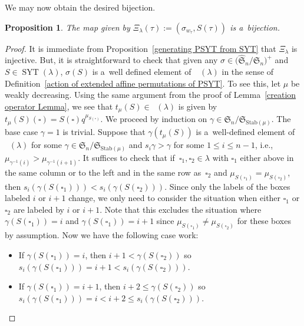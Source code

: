 \documentclass[10pt,a4paper]{amsart}
\numberwithin{equation}{section}
\newtheorem{Proposition}[Theorem]{Proposition}
\theoremstyle{definition}
\DeclareMathOperator{\SYT}{\mathrm{SYT}}
\DeclareMathOperator{\PSYT}{\mathrm{PSYT}_{\geq 0}}
\begin{document}
We may now obtain the desired bijection.

\begin{Proposition}\label{bijection between PSYT and pairs on min coset reps and SYT}
 The map \smash{$\Xi_{\lambda}\colon \PSYT(\lambda) \rightarrow \bigl(\widehat{\mathfrak{S}}_n/\mathfrak{S}_n \bigr)^{+} \times \SYT(\lambda)$} given by
 $\Xi_{\lambda}(\tau) := (\sigma_{w_{\tau}},\allowbreak S(\tau))$ is a~bijection.
\end{Proposition}
\begin{proof}
 It is immediate from Proposition~\ref{generating PSYT from SYT} that $\Xi_{\lambda}$ is injective. But, it is straightforward to check that given any $\sigma \in \bigl(\widehat{\mathfrak{S}}_n/\mathfrak{S}_n \bigr)^{+}$ and $S \in \SYT(\lambda)$, $\sigma(S)$ is a~well defined element of~$\PSYT(\lambda)$ in the sense of Definition~\ref{action of extended affine permutations of PSYT}. To see this, let $\mu$ be weakly decreasing. Using the same argument from the proof of Lemma~\ref{creation operator Lemma}, we see that $t_{\mu}(S) \in \PSYT(\lambda)$ is given by~${t_{\mu}(S)(\square) = S(\square) q^{\mu_{S(\square)}}}$. We proceed by induction on $\gamma \in \mathfrak{S}_n/\mathfrak{S}_{\text{Stab}(\mu)}$. The base case $\gamma = 1$ is trivial. Suppose that $\gamma(t_{\mu}(S))$ is a~well-defined element of $\PSYT(\lambda)$ for some $\gamma \in \mathfrak{S}_n/\mathfrak{S}_{\text{Stab}(\mu)}$ and $s_i\gamma > \gamma$ for some $1\leq i \leq n-1$, i.e.,
 $\mu_{\gamma^{-1}(i)} > \mu_{\gamma^{-1}(i+1)}$. It suffices to check that if~${\square_1,\square_2 \in \lambda}$ with $\square_1$ either above in the same column or to the left and in the same row as~$\square_2$ and $\mu_{S(\square_1)} = \mu_{S(\square_2)}$, then $s_i(\gamma(S(\square_1))) < s_i(\gamma(S(\square_2)))$. Since only the labels of the boxes labeled $i$ or $i+1$ change, we only need to consider the situation when either $\square_1$ or $\square_2$ are labeled by $i$ or $i+1$. Note that this excludes the situation where $\gamma(S(\square_1)) = i$ and $\gamma(S(\square_1)) = i+1$ since $\mu_{S(\square_1)} \neq \mu_{S(\square_2)}$ for these boxes by assumption. Now we have the following case work:
 \begin{itemize}
\itemsep=0pt
 \item If $ \gamma(S(\square_1)) = i$, then $ i+1 < \gamma(S(\square_2))$ so $s_i(\gamma(S(\square_1))) = i+1 < s_i(\gamma(S(\square_2)))$.
 \item If $\gamma(S(\square_1)) = i+1$, then $i+2 \leq \gamma(S(\square_2))$ so $s_i(\gamma(S(\square_1))) = i < i+2 \leq s_i(\gamma(S(\square_2)))$.

\end{itemize}
\end{proof}
\end{document}
